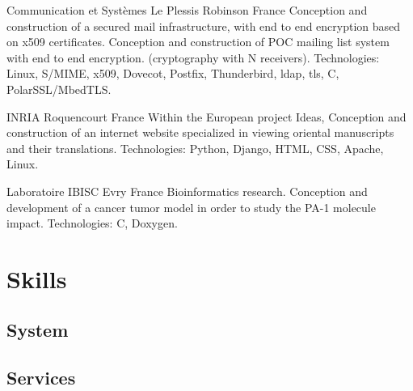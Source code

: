 \documentclass[10pt,a4paper,sans]{moderncv}        %
\begin{document}
        {Communication et Systèmes}
        {Le Plessis Robinson}
        {France}
        {Conception and construction of a secured mail infrastructure, with end to end encryption
         based on x509 certificates. Conception and construction of POC mailing list system with end to end encryption.
         (cryptography with N receivers).
         \newline Technologies: Linux, S/MIME, x509, Dovecot, Postfix, Thunderbird, ldap, tls, C, PolarSSL/MbedTLS.
        }

        {INRIA}
        {Roquencourt}
        {France}
        {Within the European project Ideas, Conception and construction of an
         internet website specialized in viewing oriental manuscripts and their
         translations.
           \newline Technologies: Python, Django, HTML, CSS, Apache, Linux.
        }

        {Laboratoire IBISC}
        {Evry}
        {France}
        {Bioinformatics research. Conception
         and development of a cancer tumor model in order to
         study the PA-1 molecule impact.
          \newline Technologies: C, Doxygen.
        }

\section{Skills}

\subsection{System}

\subsection{Services}
\end{document}
